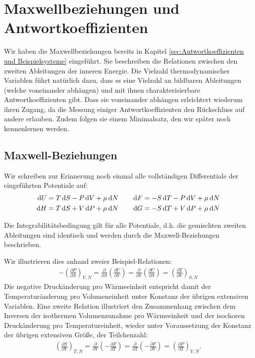 
\chapter{Maxwellbeziehungen und Antwortkoeffizienten}
\label{sec:Maxwellbeziehungen und Antwortkoeffizienten}
Wir haben die Maxwellbeziehungen bereits in Kapitel \ref{sec:Antwortkoeffizienten und Beispielsysteme} eingeführt. Sie beschreiben die Relationen zwischen den zweiten Ableitungen der inneren Energie. Die Vielzahl thermodynamischer Variablen führt natürlich dazu, dass es eine Vielzahl an bildbaren Ableitungen (welche voneinander abhängen) und mit ihnen charakterisierbare Antwortkoeffizienten gibt.
Dass sie voneinander abhängen erleichtert wiederum ihren Zugang, da die Messung einiger Antwortkoeffizienten den Rückschluss auf andere erlauben. Zudem folgen sie einem Minimalsatz, den wir später noch kennenlernen werden.

\section{Maxwell-Beziehungen}
	Wir schreiben zur Erinnerung noch einmal alle vollständigen Differentiale der eingeführten Potentiale auf:
	\begin{align*}
			\diff U=T\diff S-P\diff V+\mu \diff N \qquad \diff F =-S\diff T-P\diff V+\mu \diff N\\
			\diff H=T\diff S+V\diff P+\mu \diff N \qquad \diff G=-S\diff T+V\diff P+\mu \diff N
	\end{align*}
	\begin{formal}
		Die Integrabilitätsbedingung gilt für alle Potentiale, d.h. die gemischten zweiten Ableitungen sind identisch und werden durch die Maxwell-Beziehungen beschrieben.
	\end{formal}
	Wir illustrieren dies anhand zweier Beispiel-Relationen:
	\begin{align*}
		-\left(\frac{\partial P}{\partial  S}\right)_{V,N}=\frac{\partial}{\partial S}\left(\frac{\partial U}{\partial V}\right)=\frac{\partial}{\partial V}\left(\frac{\partial U}{\partial S}\right)=\left(\frac{\partial T}{\partial V}\right)_{S,N}
	\end{align*}
	Die negative Druckänderung pro Wärmeeinheit entspricht damit der Temperaturänderung pro Volumeneinheit unter Konstanz der übrigen extensiven Variablen. 
	Eine zweite Relation illustriert den Zusammenhang zwischen dem Inversen der isothermen Volumenzunahme pro Wärmeeinheit und der isochoren Druckänderung pro Temperatureinheit, wieder unter Voraussetzung der Konstanz der übrigen extensiven Größe, der Teilchenzahl:
	\begin{align*}
		\left(\frac{\partial S}{\partial  V}\right)_{T,N}=\frac{\partial}{\partial V}\left(-\frac{\partial F}{\partial T}\right)=\frac{\partial}{\partial T}\left(-\frac{\partial F}{\partial V}\right)=\left(\frac{\partial P}{\partial T}\right)_{V,N}.
	\end{align*}

